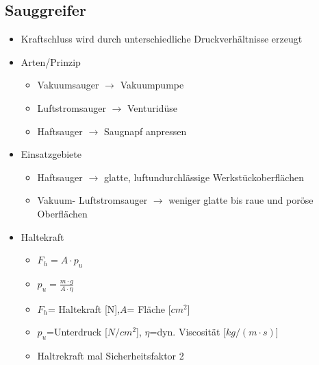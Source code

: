 \begin{minipage}{0.5\linewidth}
    \subsection{Sauggreifer}
    \begin{itemize}
        \item Kraftschluss wird durch unterschiedliche Druckverhältnisse erzeugt
        \item Arten/Prinzip
        \begin{itemize}
            \item Vakuumsauger $\rightarrow$ Vakuumpumpe
            \item Luftstromsauger $\rightarrow$ Venturidüse
            \item Haftsauger $\rightarrow$ Saugnapf anpressen
        \end{itemize}
        \item Einsatzgebiete
        \begin{itemize}
            \item Haftsauger $\rightarrow$ glatte, luftundurchlässige Werkstückoberflächen
            \item Vakuum- Luftstromsauger $\rightarrow$ weniger glatte bis raue und poröse Oberflächen
        \end{itemize}
        \item Haltekraft
        \begin{itemize}
            \item[] $ F_h=A\cdot p_u$
            \item[] $ p_u= \frac{m\cdot g}{A \cdot \eta}$
            \item[] $F_h$= Haltekraft [N],$A$= Fläche [$cm^2$]
            \item[] $p_u$=Unterdruck [$N/cm^2$], $\eta$=dyn. Viscosität [$kg/(m\cdot s)$]
            \item[] Haltrekraft mal Sicherheitsfaktor 2
        \end{itemize}
    \end{itemize}
\end{minipage}
